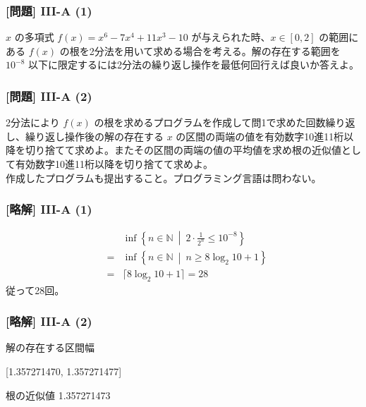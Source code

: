 \documentclass[dvipdfmx,aspectratio=169,20pt]{beamer}
\newcommand{\myfontsetting}[3]{{\fontsize{#1}{#2}\selectfont #3}}
\begin{document}
\begin{frame}
\frametitle{[問題] I\hspace{-.1em}I\hspace{-.1em}I-A (1)}
\myfontsetting{18pt}{20pt}{
$x$ の多項式 $f(x)=x^6-7x^4+11x^3-10$ が与えられた時、$x\in [0,2]$ の範囲にある $f(x)$ の根を2分法を用いて求める場合を考える。解の存在する範囲を $10^{-8}$ 以下に限定するには2分法の繰り返し操作を最低何回行えば良いか答えよ。%
}
\end{frame}
\begin{frame}
\frametitle{[問題] I\hspace{-.1em}I\hspace{-.1em}I-A (2)}
\myfontsetting{18pt}{20pt}{
2分法により $f(x)$ の根を求めるプログラムを作成して問1で求めた回数繰り返し、繰り返し操作後の解の存在する $x$ の区間の両端の値を有効数字10進11桁以降を切り捨てて求めよ。またその区間の両端の値の平均値を求め根の近似値として有効数字10進11桁以降を切り捨てて求めよ。
}\\
\myfontsetting{12pt}{14pt}{
作成したプログラムも提出すること。プログラミング言語は問わない。
}
\end{frame}
\begin{frame}
\frametitle{[略解] I\hspace{-.1em}I\hspace{-.1em}I-A (1)}
\vspace{-0.5cm}
\begin{eqnarray*}
    &&\inf \left\{n\in \mathbb{N}\  \middle| \ 2\cdot \frac{1}{2^n}\le 10^{-8} \right\}\\
    &=& \inf \left\{n\in \mathbb{N}\  \middle| \ n \ge 8\log_2 10 +1 \right\}\\
    &=& \lceil 8\log_2 10 +1 \rceil= 28
\end{eqnarray*}
従って28回。
\end{frame}
\begin{frame}
\frametitle{[略解] I\hspace{-.1em}I\hspace{-.1em}I-A (2)}
解の存在する区間幅

[1.357271470, 1.357271477]

\vspace{0.5cm}
根の近似値 1.357271473

\end{frame}
\end{document}
